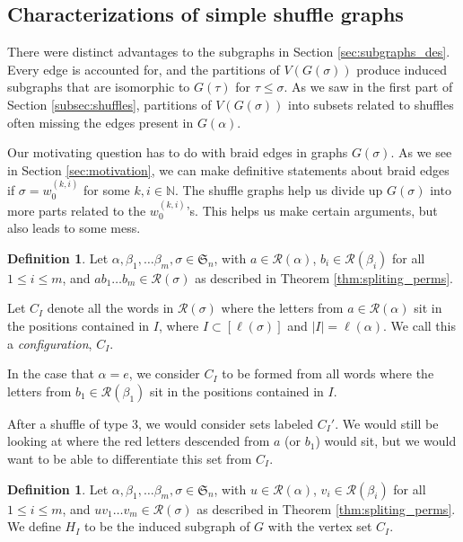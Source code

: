 \documentclass[11pt,reqno]{amsart}
\theoremstyle{definition}
\newtheorem{definition}[theorem]{Definition}
\theoremstyle{notation}
\newcommand{\calR}{\mathcal{R}}
\newcommand{\N}{\mathbb{N}}
\newcommand{\JEem}{\textit}
\begin{document}
\subsection{Characterizations of simple shuffle graphs}

There were distinct advantages to the subgraphs in Section \ref{sec:subgraphs_des}. Every edge is accounted for, and the partitions of $V(G(\sigma))$ produce induced subgraphs that are isomorphic to $G(\tau)$ for $\tau \leq \sigma$. As we saw in the first part of Section \ref{subsec:shuffles}, partitions of $V(G(\sigma))$ into subsets related to shuffles often missing the edges present in $G(\alpha)$. 

Our motivating question has to do with braid edges in graphs $G(\sigma)$. As we see in Section \ref{sec:motivation}, we can make definitive statements about braid edges if $\sigma = w_0^{(k,i)}$ for some $k,i\in \N$. The shuffle graphs help us divide up $G(\sigma)$ into more parts related to the $w_0^{(k,i)}$'s. This helps us make certain arguments, but also leads to some mess.

\begin{definition}\label{config}
Let $\alpha, \beta_1, \ldots \beta_m, \sigma\in \mathfrak{S}_n$, with $a\in \calR(\alpha)$, $b_i\in \calR(\beta_i)$ for all $1\leq i \leq m$, and $ab_1\ldots b_m\in \calR(\sigma)$ as described in Theorem \ref{thm:spliting_perms}. 

Let $C_I$ denote all the words in $\calR(\sigma)$ where the letters from $a\in \calR(\alpha)$ sit in the positions contained in $I$, where $I \subset [\ell(\sigma)]$ and $|I|=\ell(\alpha)$. We call this a \JEem{configuration}, $C_I$.

In the case that $\alpha = e$, we consider $C_I$ to be formed from all words where the letters from $b_1\in \calR(\beta_1)$ sit in the positions contained in $I$.
\end{definition}

After a shuffle of type 3, we would consider sets labeled $C_I'$. We would still be looking at where the red letters descended from $a$ (or $b_1$) would sit, but we would want to be able to differentiate this set from $C_I$. 

\begin{definition}\label{shufflesubgraph}
Let $\alpha, \beta_1, \ldots \beta_m, \sigma\in \mathfrak{S}_n$, with $u\in \calR(\alpha)$, $v_i\in \calR(\beta_i)$ for all $1\leq i \leq m$, and $uv_1\ldots v_m\in \calR(\sigma)$ as described in Theorem \ref{thm:spliting_perms}. We define $H_I$ to be the induced subgraph of $G$ with the vertex set $C_I$. 
\end{definition}
\end{document}
